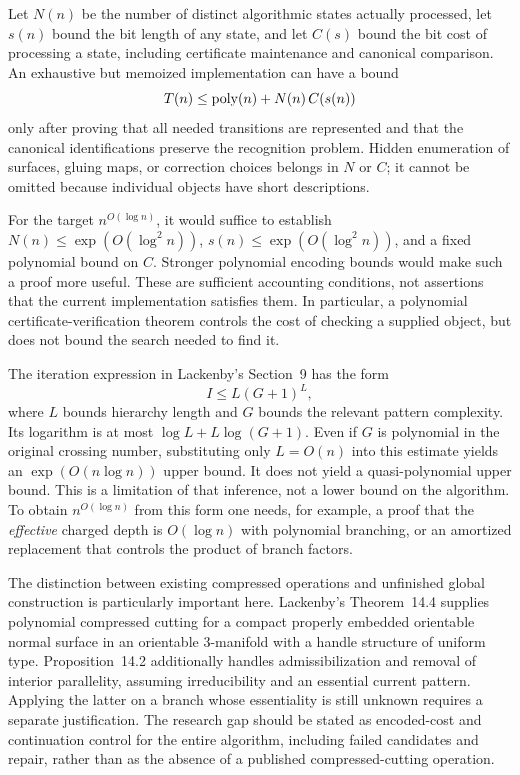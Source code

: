Let $N(n)$ be the number of distinct algorithmic states actually processed,
let $s(n)$ bound the bit length of any state, and let $C(s)$ bound the bit
cost of processing a state, including certificate maintenance and canonical
comparison. An exhaustive but memoized implementation can have a bound
\begin{equation}\label{eq:global-ledger}
 T(n)\le\operatorname{poly}(n)+N(n)\,C(s(n))
\end{equation}
only after proving that all needed transitions are represented and that
the canonical identifications preserve the recognition problem. Hidden
enumeration of surfaces, gluing maps, or correction choices belongs in
$N$ or $C$; it cannot be omitted because individual objects have short
descriptions.

For the target $n^{O(\log n)}$, it would suffice to establish
$N(n)\le\exp(O(\log^2 n))$, $s(n)\le\exp(O(\log^2 n))$, and a fixed
polynomial bound on $C$. Stronger polynomial encoding bounds would make
such a proof more useful. These are sufficient accounting conditions,
not assertions that the current implementation satisfies them. In
particular, a polynomial certificate-verification theorem controls the
cost of checking a supplied object, but does not bound the search needed
to find it.

The iteration expression in Lackenby's Section~9 has the form
\begin{equation}\label{eq:lackenby-iterations}
 I\le L(G+1)^L,
\end{equation}
where $L$ bounds hierarchy length and $G$ bounds the relevant pattern
complexity. Its logarithm is at most
$\log L+L\log(G+1)$. Even if $G$ is polynomial in the original crossing
number, substituting only $L=O(n)$ into this estimate yields an
$\exp(O(n\log n))$ upper bound. It does not yield a quasi-polynomial
upper bound. This is a limitation of that inference, not a lower bound
on the algorithm. To obtain $n^{O(\log n)}$ from this form one needs,
for example, a proof that the \emph{effective} charged depth is
$O(\log n)$ with polynomial branching, or an amortized replacement that
controls the product of branch factors.

The distinction between existing compressed operations and unfinished
global construction is particularly important here. Lackenby's
Theorem~14.4 supplies polynomial compressed cutting for a compact properly
embedded orientable normal surface in an orientable 3-manifold with a
handle structure of uniform type. Proposition~14.2 additionally handles
admissibilization and removal of interior parallelity, assuming
irreducibility and an essential current pattern. Applying the latter on a branch whose
essentiality is still unknown requires a separate justification. The
research gap should be stated as encoded-cost and continuation control
for the entire algorithm, including failed candidates and repair, rather
than as the absence of a published compressed-cutting operation.


